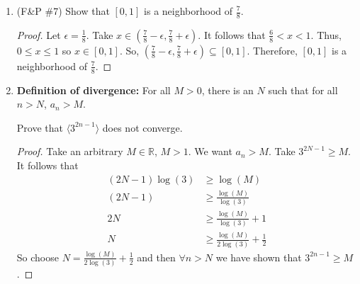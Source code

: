 \documentclass{article}
\theoremstyle{problem}
\theoremstyle{plain}
\theoremstyle{remark}
\newcommand{\abs}[1] {
  \left| #1 \right|
}
\begin{document}
\begin{enumerate}
\item (F\&P \#7) Show that $[0,1]$ is a neighborhood of $\frac{7}{8}$.
  \begin{proof}
    Let $\epsilon = \frac{1}{8}$. 
    Take $x \in (\frac{7}{8} - \epsilon, \frac{7}{8} + \epsilon)$.
    It follows that $ \frac{6}{8} < x < 1$. 
    Thus, $0 \leq x \leq 1$ so $x \in [0,1]$.
    So, $(\frac{7}{8} - \epsilon, \frac{7}{8} + \epsilon) \subseteq [0,1]$.
    Therefore, $[0,1]$ is a neighborhood of $\frac{7}{8}$.
  \end{proof}
\item \textbf{Definition of divergence:} For all $M > 0$, there is an $N$ such that for all $n > N$, $a_n > M$.
 
 Prove that $\langle 3^{2n-1} \rangle$ does not converge.
 \begin{proof}
   Take an arbitrary $M \in \mathbb R$, $M > 1$.
   We want $a_n > M$.
   Take $3^{2N-1} \geq M$.
   It follows that
   \begin{align*}
     (2N - 1) \log (3) &\geq \log (M)\\
     (2N - 1) &\geq \frac{\log (M)}{\log (3)}\\
     2N &\geq \frac{\log (M)}{\log (3)} + 1\\
     N &\geq \frac{\log (M)}{2 \log (3)} + \frac{1}{2}
   \end{align*}
   So choose $N = \frac{\log (M)}{2 \log (3)} + \frac{1}{2}$ and then $\forall n > N$ we have shown that $3^{2n-1} \geq M$.
 \end{proof}
 




\end{enumerate}
\end{document}
